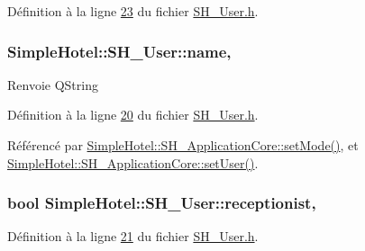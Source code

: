 Définition à la ligne \hyperlink{SH__User_8h_source_l00023}{23} du fichier \hyperlink{SH__User_8h_source}{S\-H\-\_\-\-User.\-h}.

\hypertarget{classSimpleHotel_1_1SH__User_a060aa57674e4cabf6a650b015563da77}{
\subsubsection[{name}]{\setlength{\rightskip}{0pt plus 5cm}Simple\-Hotel\-::\-S\-H\-\_\-\-User\-::name\hspace{0.3cm}{\ttfamily [read]}, {\ttfamily [inherited]}}}\label{classSimpleHotel_1_1SH__User_a060aa57674e4cabf6a650b015563da77}
\begin{DoxyReturn}{Renvoie}
Q\-String 
\end{DoxyReturn}


Définition à la ligne \hyperlink{SH__User_8h_source_l00020}{20} du fichier \hyperlink{SH__User_8h_source}{S\-H\-\_\-\-User.\-h}.



Référencé par \hyperlink{classSimpleHotel_1_1SH__ApplicationCore_a1661e9a56883ec760064066386b47bab}{Simple\-Hotel\-::\-S\-H\-\_\-\-Application\-Core\-::set\-Mode()}, et \hyperlink{classSimpleHotel_1_1SH__ApplicationCore_a2af3f48e113eaa6771a0fa328bd9f2e1}{Simple\-Hotel\-::\-S\-H\-\_\-\-Application\-Core\-::set\-User()}.

\hypertarget{classSimpleHotel_1_1SH__User_a44c4e3922422c460cabfc7b7011d9bcb}{
\subsubsection[{receptionist}]{\setlength{\rightskip}{0pt plus 5cm}bool Simple\-Hotel\-::\-S\-H\-\_\-\-User\-::receptionist\hspace{0.3cm}{\ttfamily [read]}, {\ttfamily [inherited]}}}\label{classSimpleHotel_1_1SH__User_a44c4e3922422c460cabfc7b7011d9bcb}


Définition à la ligne \hyperlink{SH__User_8h_source_l00021}{21} du fichier \hyperlink{SH__User_8h_source}{S\-H\-\_\-\-User.\-h}.


